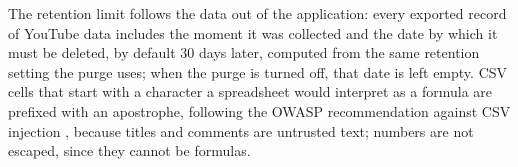 The retention limit follows the data out of the application: every exported record of YouTube data includes the moment it was collected and the date by which it must be deleted, by default 30 days later, computed from the same retention setting the purge uses; when the purge is turned off, that date is left empty. CSV cells that start with a character a spreadsheet would interpret as a formula are prefixed with an apostrophe, following the OWASP recommendation against CSV injection \autocite{owasp_csv_injection}, because titles and comments are untrusted text; numbers are not escaped, since they cannot be formulas.
